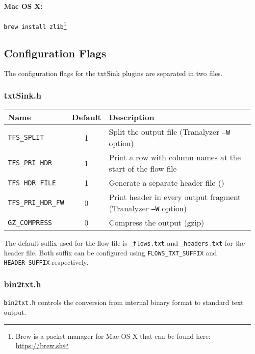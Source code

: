 \documentclass[documentation]{subfiles}
\begin{document}
\paragraph{Mac OS X:} {\tt brew install zlib}\footnote{Brew is a packet manager for Mac OS X that can be found here: \url{https://brew.sh}}

\subsection{Configuration Flags}
The configuration flags for the txtSink plugins are separated in two files.

\subsubsection{txtSink.h}
\begin{longtable}{lcl}
    \toprule
    {\bf Name} & {\bf Default} & {\bf Description}\\
    \midrule\endhead%
    {\tt TFS\_SPLIT}        & 1 & Split the output file (Tranalyzer {\tt --W} option)\\
    {\tt TFS\_PRI\_HDR}     & 1 & Print a row with column names at the start of the flow file\\
    {\tt TFS\_HDR\_FILE}    & 1 & Generate a separate header file ({s:tfsHeader})\\
    {\tt TFS\_PRI\_HDR\_FW} & 0 & Print header in every output fragment (Tranalyzer {\tt --W} option)\\
    {\tt GZ\_COMPRESS}      & 0 & Compress the output (gzip)\\
    \bottomrule
\end{longtable}
The default suffix used for the flow file is {\tt \_flows.txt} and {\tt \_headers.txt} for the header file. Both suffix can be configured using {\tt FLOWS\_TXT\_SUFFIX} and {\tt HEADER\_SUFFIX} respectively.

\subsubsection{bin2txt.h}
{\tt bin2txt.h} controls the conversion from internal binary format to standard text output.
\end{document}
